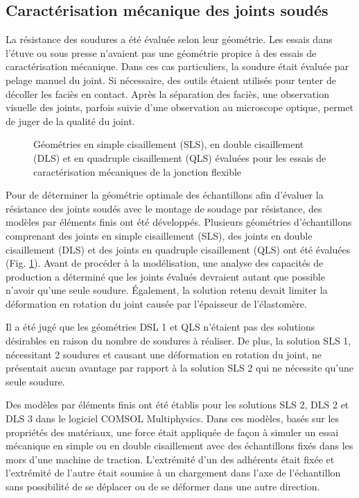 \subsection{Caractérisation mécanique des joints soudés}

La résistance des soudures a été évaluée selon leur géométrie. 
Les essais dans l'étuve ou sous presse n'avaient pas une géométrie propice à des essais de caractérisation mécanique. 
Dans ces cas particuliers, la soudure était évaluée par pelage manuel du joint. 
Si nécessaire, des outils étaient utilisés pour tenter de décoller les faciès en contact. 
Après la séparation des faciès, une observation visuelle des joints, parfois suivie d'une observation au microscope optique, permet de juger de la qualité du joint. 

\begin{figure}[h]
	\centering
	
	\caption{Géométries en simple cisaillement (SLS), en double cisaillement (DLS) et en quadruple cisaillement (QLS) évaluées pour les essais de caractérisation mécaniques de la jonction flexible}
	\label{fig:geometrie_echantillons}
\end{figure}

Pour de déterminer la géométrie optimale des échantillons afin d'évaluer la résistance des joints soudés avec le montage de soudage par résistance, des modèles par éléments finis ont été développés. 
Plusieurs géométries d'échantillons comprenant des joints en simple cisaillement (SLS), des joints en double cisaillement (DLS) et des joints en quadruple cisaillement (QLS) ont été évaluées (Fig. \ref{fig:geometrie_echantillons}). 
Avant de procéder à la modélisation, une analyse des capacités de production a déterminé que les joints évalués devraient autant que possible n'avoir qu'une seule soudure. 
Également, la solution retenu devait limiter la déformation en rotation du joint causée par l'épaisseur de l'élastomère. 

Il a été jugé que les géométries DSL 1 et QLS n'étaient pas des solutions désirables en raison du nombre de soudures à réaliser. 
De plus, la solution SLS 1, nécessitant 2 soudures et causant une déformation en rotation du joint, ne présentait aucun avantage par rapport à la solution SLS 2 qui ne nécessite qu'une seule soudure. 

Des modèles par éléments finis ont été établis pour les solutions SLS 2, DLS 2 et DLS 3 dans le logiciel COMSOL Mul\-ti\-phy\-sics\-\textregistered . 
Dans ces modèles, basés sur les propriétés des matériaux, une force était appliquée de façon à simuler un essai mécanique en simple ou en double cisaillement avec des échantillons fixés dans les mors d'une machine de traction. 
L'extrémité d'un des adhérents était fixée et l'extrémité de l'autre était soumise à un chargement dans l'axe de l'échantillon sans possibilité de se déplacer ou de se déformer dans une autre direction. 

